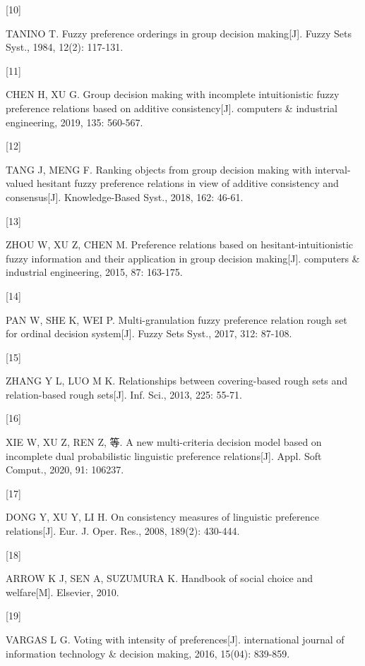 \documentclass[
  letterpaper,
  DIV=11,
  numbers=noendperiod]{scrartcl}
\newlength{\cslhangindent}
\newlength{\csllabelwidth}
\newenvironment{CSLReferences}[2] %
 {\begin{list}{}{%
  \setlength{\itemindent}{0pt}
  \setlength{\leftmargin}{0pt}
  \setlength{\parsep}{0pt}
  \ifodd #1
   \setlength{\leftmargin}{\cslhangindent}
   \setlength{\itemindent}{-1\cslhangindent}
  \fi
  \setlength{\itemsep}{#2\baselineskip}}}
 {\end{list}}
\newcommand{\CSLLeftMargin}[1]{\parbox[t]{\csllabelwidth}{\strut#1\strut}}
\newcommand{\CSLRightInline}[1]{\parbox[t]{\linewidth - \csllabelwidth}{\strut#1\strut}}
\begin{document}
\begin{CSLReferences}{0}{0}
\CSLLeftMargin{{[}10{]} }%
\CSLRightInline{TANINO T. Fuzzy preference orderings in group decision
making{[}J{]}. Fuzzy Sets Syst., 1984, 12(2): 117-131.}

\CSLLeftMargin{{[}11{]} }%
\CSLRightInline{CHEN H, XU G. Group decision making with incomplete
intuitionistic fuzzy preference relations based on additive
consistency{[}J{]}. computers \& industrial engineering, 2019, 135:
560-567.}

\CSLLeftMargin{{[}12{]} }%
\CSLRightInline{TANG J, MENG F. Ranking objects from group decision
making with interval-valued hesitant fuzzy preference relations in view
of additive consistency and consensus{[}J{]}. Knowledge-Based Syst.,
2018, 162: 46-61.}

\CSLLeftMargin{{[}13{]} }%
\CSLRightInline{ZHOU W, XU Z, CHEN M. Preference relations based on
hesitant-intuitionistic fuzzy information and their application in group
decision making{[}J{]}. computers \& industrial engineering, 2015, 87:
163-175.}

\CSLLeftMargin{{[}14{]} }%
\CSLRightInline{PAN W, SHE K, WEI P. Multi-granulation fuzzy preference
relation rough set for ordinal decision system{[}J{]}. Fuzzy Sets Syst.,
2017, 312: 87-108.}

\CSLLeftMargin{{[}15{]} }%
\CSLRightInline{ZHANG Y L, LUO M K. Relationships between covering-based
rough sets and relation-based rough sets{[}J{]}. Inf. Sci., 2013, 225:
55-71.}

\CSLLeftMargin{{[}16{]} }%
\CSLRightInline{XIE W, XU Z, REN Z, 等. A new multi-criteria decision
model based on incomplete dual probabilistic linguistic preference
relations{[}J{]}. Appl. Soft Comput., 2020, 91: 106237.}

\CSLLeftMargin{{[}17{]} }%
\CSLRightInline{DONG Y, XU Y, LI H. On consistency measures of
linguistic preference relations{[}J{]}. Eur. J. Oper. Res., 2008,
189(2): 430-444.}

\CSLLeftMargin{{[}18{]} }%
\CSLRightInline{ARROW K J, SEN A, SUZUMURA K. Handbook of social choice
and welfare{[}M{]}. Elsevier, 2010.}

\CSLLeftMargin{{[}19{]} }%
\CSLRightInline{VARGAS L G. Voting with intensity of preferences{[}J{]}.
international journal of information technology \& decision making,
2016, 15(04): 839-859.}


\end{CSLReferences}
\end{document}
